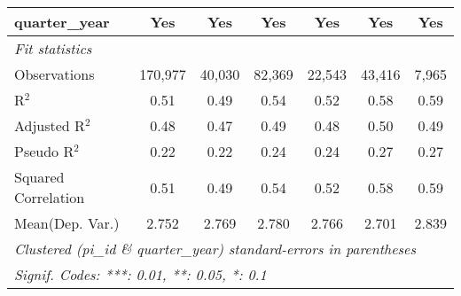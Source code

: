 \begin{tabular}{lcccccc}
   quarter\_year                                              & Yes          & Yes           & Yes          & Yes           & Yes           & Yes\\  
   \midrule
   \emph{Fit statistics}\\
   Observations                                               & 170,977      & 40,030        & 82,369       & 22,543        & 43,416        & 7,965\\  
   R$^2$                                                      & 0.51         & 0.49          & 0.54         & 0.52          & 0.58          & 0.59\\  
   Adjusted R$^2$                                             & 0.48         & 0.47          & 0.49         & 0.48          & 0.50          & 0.49\\  
   Pseudo R$^2$                                               & 0.22         & 0.22          & 0.24         & 0.24          & 0.27          & 0.27\\  
   Squared Correlation                                        & 0.51         & 0.49          & 0.54         & 0.52          & 0.58          & 0.59\\  
Mean(Dep. Var.) & 2.752 & 2.769 & 2.780 & 2.766 & 2.701 & 2.839 \\
   \midrule \midrule
   \multicolumn{7}{l}{\emph{Clustered (pi\_id \& quarter\_year) standard-errors in parentheses}}\\
   \multicolumn{7}{l}{\emph{Signif. Codes: ***: 0.01, **: 0.05, *: 0.1}}\\
\end{tabular}
\par\endgroup
